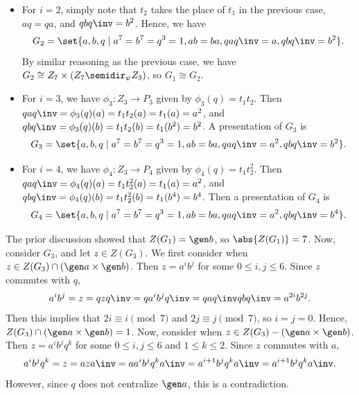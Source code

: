 \begin{solenum}
\begin{itemize}
        If we consider a homomorphism $\psi \colon Z_3 \to \aut(Z_7)$, then $q \mapsto \alpha$ or $q \mapsto \alpha^2$ such that $\alpha$ generates the unique subgroup of order 3 in $\aut(Z_7)$.
        In either case, we have $\gen{a, q} \cong Z_7 \semidir_\psi Z_3$ as it satisfies the relations $qaq\inv = a^2$ in the na\"ive presentation.
        Hence, we have
        \[
        	G_1 \cong Z_7 \times (Z_7 \semidir_\psi Z_3).
        \]
        \item For $i = 2$, simply note that $t_2$ takes the place of $t_1$ in the previous case, $aq = qa$, and $qbq\inv = b^2$.
	    Hence, we have
        \[
        	G_2 = \set{a, b, q \mid a^7 = b^7 = q^3 = 1, ab = ba, qaq\inv = a, qbq\inv = b^2}.
        \]
        By similar reasoning as the previous case, we have $G_2 \cong Z_7 \times (Z_7 \semidir_\psi Z_3)$, so $G_1 \cong G_2$.
        \item For $i = 3$, we have $\phi_3 \colon Z_3 \to P_3$ given by $\phi_3(q) = t_1t_2$.
        Then $qaq\inv = \phi_3(q)(a) = t_1t_2(a) = t_1(a) = a^2$, and $qbq\inv = \phi_3(q)(b) = t_1t_2(b) = t_1(b^2) = b^2$.
        A presentation of $G_3$ is
        \[
        	G_3 = \set{a, b, q \mid a^7 = b^7 = q^3 = 1, ab = ba, qaq\inv = a^2, qbq\inv = b^2}.
        \]
        \item For $i = 4$, we have $\phi_4 \colon Z_3 \to P_4$ given by $\phi_4(q) = t_1t_2^2$.
        Then $qaq\inv = \phi_4(q)(a) = t_1t_2^2(a) = t_1(a) = a^2$, and $qbq\inv = \phi_4(q)(b) = t_1t_2^2(b) = t_1(b^4) = b^4$.
        Then a presentation of $G_4$ is
        \[
        	G_4 = \set{a, b, q \mid a^7 = b^7 = q^3 = 1, ab = ba, qaq\inv = a^2, qbq\inv = b^4}.
        \]
    \end{itemize}
    \item The prior discussion showed that $Z(G_1) = \gen b$, so $\abs{Z(G_1)} = 7$.
	Now, consider $G_3$, and let $z \in Z(G_3)$.
	We first consider when $z \in Z(G_3) \cap (\gen a \times \gen b)$.
	Then $z = a^ib^j$ for some $0 \leq i, j \leq 6$.
	Since $z$ commutes with $q$, 
    \[
    	a^ib^j = z = qzq\inv = qa^ib^jq\inv = qaq\inv qbq\inv = a^{2i}b^{2j}.
    \]
    Then this implies that $2i \equiv i \pmod 7$ and $2j \equiv j \pmod 7$, so $i = j =0$.
	Hence, $Z(G_3) \cap (\gen a \times \gen b) = 1$.
	Now, consider when $z \in Z(G_3) - (\gen a \times \gen b)$.
	Then $z = a^ib^jq^k$ for some $0 \leq i, j \leq 6$ and $1 \leq k \leq 2$.
	Since $z$ commutes with $a$, 
    \[
    	a^ib^jq^k = z = aza\inv = aa^ib^jq^ka\inv = a^{i+1}b^jq^ka\inv = a^{i+1}b^jq^ka\inv.
    \]
    However, since $q$ does not centralize $\gen a$, this is a contradiction.

\end{solenum}
